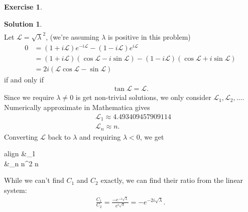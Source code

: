 \documentclass{book}
\theoremstyle{definition}
\newtheorem*{exer*}{Exercise}
\newtheorem*{sln*}{Solution}
\newcommand{\lag}{\mathcal{L}}
\begin{document}
\begin{exer*}
\begin{enumerate}
\begin{sln*}
\begin{align*}
			\end{align*}
			Let $\lag = \sqrt{\lambda}^2$, (we're assuming $\lambda$ is positive in this problem)
			\begin{align*}
			0 &= (1+i\lag)e^{-i\lag} - (1-i\lag)e^{i\lag}\\
			&= (1+i\lag)(\cos\lag - i\sin\lag) - (1-i\lag)(\cos\lag + i\sin\lag)\\
			&= 2i (\lag\cos\lag - \sin\lag)
			\end{align*}
			if and only if
			\begin{align*}
			\boxed{\tan\lag = \lag}.
			\end{align*}
			Since we require $\lambda\neq 0$ is get non-trivial solutions, we only consider $\lag_1,\lag_2,\dots$. Numerically approximate in Mathematica gives
			\begin{align*}
			&\lag_1 \approx 4.493409457909114\\
			&\lag_n \approx n.
			\end{align*}
			Converting $\lag$ back to $\lambda$ and requiring $\lambda < 0$, we get
			\begin{empheq}[box=\fbox]{align} 
			&\lambda_1 \nonumber\\
			&\lambda_n \approx n^2\hspace{0.5cm} n \nonumber 
			\end{empheq}
			While we can't find $C_1$ and $C_2$ exactly, we can find their ratio from the linear system:
			\begin{align*}
			\frac{C_1}{C_2} = \frac{-e^{-i\sqrt{\lambda}}}{e^{i\sqrt{\lambda}}} = -e^{-2i\sqrt{\lambda}}.
			\end{align*}
			

\end{sln*}
\end{enumerate}
\end{exer*}
\end{document}
